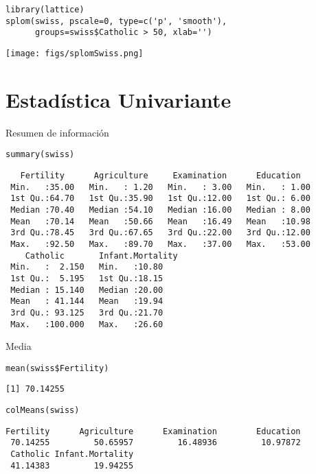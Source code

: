 \documentclass[xcolor={usenames,svgnames,dvipsnames}]{beamer}
\begin{document}
\begin{frame}[fragile,label={sec:org1aaf05d}]{}
 \lstset{language=r,label= ,caption= ,captionpos=b,numbers=none}
\begin{lstlisting}
library(lattice)
splom(swiss, pscale=0, type=c('p', 'smooth'),
      groups=swiss$Catholic > 50, xlab='')
\end{lstlisting}

\begin{center}
\texttt{[image: figs/splomSwiss.png]}
\end{center}
\end{frame}

\section{Estadística Univariante}
\label{sec:org4316fbc}

\begin{frame}[fragile,label={sec:orgf2f83a9}]{Resumen de  información}
 \lstset{language=r,label= ,caption= ,captionpos=b,numbers=none}
\begin{lstlisting}
summary(swiss)
\end{lstlisting}

\begin{verbatim}
   Fertility      Agriculture     Examination      Education    
 Min.   :35.00   Min.   : 1.20   Min.   : 3.00   Min.   : 1.00  
 1st Qu.:64.70   1st Qu.:35.90   1st Qu.:12.00   1st Qu.: 6.00  
 Median :70.40   Median :54.10   Median :16.00   Median : 8.00  
 Mean   :70.14   Mean   :50.66   Mean   :16.49   Mean   :10.98  
 3rd Qu.:78.45   3rd Qu.:67.65   3rd Qu.:22.00   3rd Qu.:12.00  
 Max.   :92.50   Max.   :89.70   Max.   :37.00   Max.   :53.00  
    Catholic       Infant.Mortality
 Min.   :  2.150   Min.   :10.80   
 1st Qu.:  5.195   1st Qu.:18.15   
 Median : 15.140   Median :20.00   
 Mean   : 41.144   Mean   :19.94   
 3rd Qu.: 93.125   3rd Qu.:21.70   
 Max.   :100.000   Max.   :26.60
\end{verbatim}
\end{frame}

\begin{frame}[fragile,label={sec:orgb285293}]{Media}
 \lstset{language=r,label= ,caption= ,captionpos=b,numbers=none}
\begin{lstlisting}
mean(swiss$Fertility)
\end{lstlisting}

\begin{verbatim}
[1] 70.14255
\end{verbatim}

\lstset{language=r,label= ,caption= ,captionpos=b,numbers=none}
\begin{lstlisting}
colMeans(swiss)
\end{lstlisting}

\begin{verbatim}
Fertility      Agriculture      Examination        Education 
 70.14255         50.65957         16.48936         10.97872 
 Catholic Infant.Mortality 
 41.14383         19.94255
\end{verbatim}
\end{frame}
\end{document}
